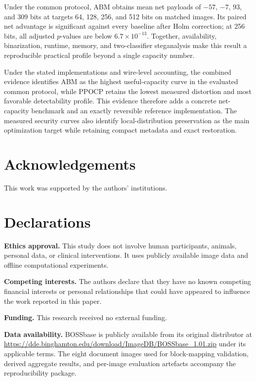 \documentclass[a4paper,fleqn]{cas-dc}
\newcommand{\RevisionAddBegin}{\begingroup\color{revisionblue}}
\newcommand{\RevisionAddEnd}{\endgroup}
\begin{document}
Under the common protocol, ABM obtains mean net payloads of $-57$, $-7$, $93$,
and $309$ bits at targets 64, 128, 256, and 512 bits on matched images. Its
paired net advantage is significant against every baseline after Holm
correction; at 256 bits, all adjusted $p$-values are below
\RevisionAddBegin
$6.7\times10^{-13}$. Together, availability, binarization, runtime, memory,
and two-classifier steganalysis make this result a reproducible practical
profile beyond a single capacity number.
\RevisionAddEnd

Under the stated implementations and wire-level accounting, the combined
\RevisionAddBegin
evidence identifies ABM as the highest useful-capacity curve in the evaluated
common protocol, while PPOCP retains the lowest measured distortion and most
favorable detectability profile. This evidence therefore adds a concrete
net-capacity benchmark and an
\RevisionAddEnd
exactly reversible reference implementation. The measured security curves
\RevisionAddBegin
also identify local-distribution preservation as the main optimization
\RevisionAddEnd
target while retaining compact metadata and exact restoration.

\section*{Acknowledgements}
\RevisionAddBegin
This work was supported by the authors' institutions.
\RevisionAddEnd

\printcredits

\section*{Declarations}
\noindent\textbf{Ethics approval.}
This study does not involve human participants, animals, personal data, or
clinical interventions. It uses publicly available image data and offline
computational experiments.

\medskip
\noindent\textbf{Competing interests.}
The authors declare that they have no known competing financial interests or
\RevisionAddBegin
personal relationships that could have appeared to influence the work reported
in this paper.
\RevisionAddEnd

\medskip
\noindent\textbf{Funding.}
This research received no external funding.

\medskip
\noindent\textbf{Data availability.}
BOSSbase is publicly available from its original distributor at
\url{https://dde.binghamton.edu/download/ImageDB/BOSSbase_1.01.zip} under its
applicable terms. The eight document images used for block-mapping validation,
derived aggregate results, and per-image evaluation artefacts accompany the
reproducibility package.
\end{document}
